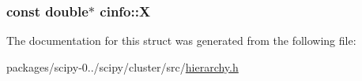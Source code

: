 \subsubsection[{X}]{\setlength{\rightskip}{0pt plus 5cm}const double$\ast$ cinfo\+::\+X}\label{structcinfo_a6ff14a480d96f620f456ed9b3338e4b2}


The documentation for this struct was generated from the following file\+:\begin{DoxyCompactItemize}
\item 
packages/scipy-\/0../scipy/cluster/src/\hyperlink{hierarchy_8h}{hierarchy.\+h}\end{DoxyCompactItemize}
